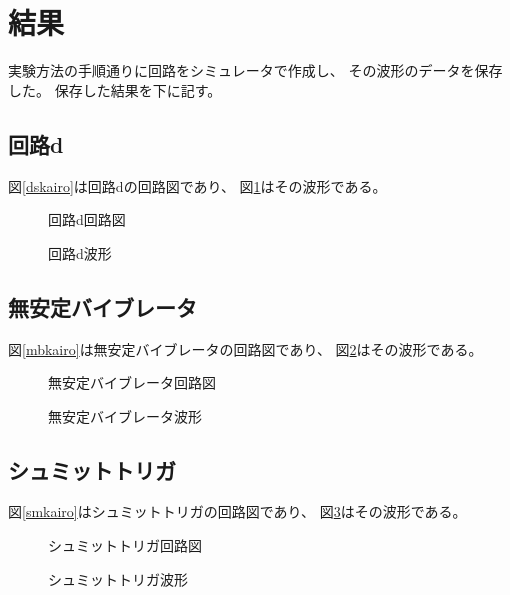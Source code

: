 \documentclass{jsarticle}
\begin{document}
\section{結果}
実験方法の手順通りに回路をシミュレータで作成し、
その波形のデータを保存した。
保存した結果を下に記す。

\subsection{回路d}
図\ref{dskairo}は回路dの回路図であり、
図\ref{dshakei}はその波形である。
\begin{figure}[htpb]
		\begin{minipage}{0.45\hsize}
				\centering
				\caption{回路d回路図}
				\label{dskairo}
		\end{minipage}
		\begin{minipage}{0.3\hsize}
				\centering
				\caption{回路d波形}
				\label{dshakei}
		\end{minipage}
\end{figure}

\subsection{無安定バイブレータ}
図\ref{mbkairo}は無安定バイブレータの回路図であり、
図\ref{mbhakei}はその波形である。
\begin{figure}[htpb]
		\begin{minipage}{0.45\hsize}
				\centering
				\caption{無安定バイブレータ回路図}
				\label{mbkairo}
		\end{minipage}
		\begin{minipage}{0.3\hsize}
				\centering
				\caption{無安定バイブレータ波形}
				\label{mbhakei}
		\end{minipage}
\end{figure}

\subsection{シュミットトリガ}
図\ref{smkairo}はシュミットトリガの回路図であり、
図\ref{smhakei}はその波形である。
\begin{figure}[htpb]
		\begin{minipage}{0.45\hsize}
				\centering
				\caption{シュミットトリガ回路図}
				\label{smkairo}
		\end{minipage}
		\begin{minipage}{0.3\hsize}
				\centering
				\caption{シュミットトリガ波形}
				\label{smhakei}
		\end{minipage}
\end{figure}
\end{document}
